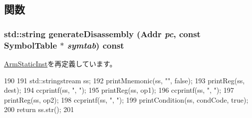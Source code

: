 \subsection{関数}
\hypertarget{classArmISA_1_1DataXCondSelOp_a95d323a22a5f07e14d6b4c9385a91896}{
\subsubsection[{generateDisassembly}]{\setlength{\rightskip}{0pt plus 5cm}std::string generateDisassembly ({\bf Addr} {\em pc}, \/  const SymbolTable $\ast$ {\em symtab}) const}}
\label{classArmISA_1_1DataXCondSelOp_a95d323a22a5f07e14d6b4c9385a91896}


\hyperlink{classArmISA_1_1ArmStaticInst_a95d323a22a5f07e14d6b4c9385a91896}{ArmStaticInst}を再定義しています。


\begin{DoxyCode}
190 {
191     std::stringstream ss;
192     printMnemonic(ss, "", false);
193     printReg(ss, dest);
194     ccprintf(ss, ", ");
195     printReg(ss, op1);
196     ccprintf(ss, ", ");
197     printReg(ss, op2);
198     ccprintf(ss, ", ");
199     printCondition(ss, condCode, true);
200     return ss.str();
201 }
\end{DoxyCode}


